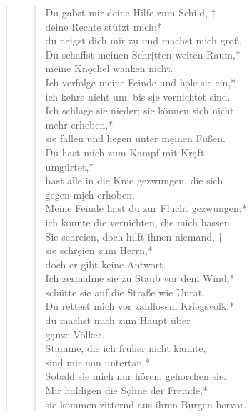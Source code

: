\begin{quote}
\begin{verse}

\vin Du gabst mir deine Hilfe zum Schild, †\\ \vin deine R\d echte stützt mich;*\\ \vin
du neigst dich mir z\d u und machst mich groß.\\

Du schaffst meinen Schr\d itten weiten Raum,*\\
meine Kn\d öchel wanken nicht.\\ \vin
Ich verfolge meine Feinde und h\d ole sie ein,*\\ \vin
ich kehre nicht um, bis s\d ie vernichtet sind.\\
Ich schlage sie nieder; sie können sich n\d icht\\  mehr erheben,*\\
sie fallen und liegen unter m\d einen Füßen.\\ \vin
Du hast mich zum Kampf mit Kr\d aft\\ \vin  umgürtet,*\\ \vin
hast alle in die Knie gezwungen, die sich \\ \vin gegen m\d ich erhoben.\\
Meine Feinde hast du zur Fl\d ucht gezwungen;*\\
ich konnte die vernichten, d\d ie mich hassen.\\ \vin
Sie schreien, doch hilft ihnen niemand, †\\ \vin  sie schr\d eien zum Herrn,*\\ \vin
doch er gibt k\d eine Antwort.\\
Ich zermalme sie zu St\d aub vor dem Wind,*\\
schütte sie auf die Str\d aße wie Unrat.\\ \vin
Du rettest mich vor z\d ahllosem Kriegsvolk,*\\ \vin
du machst mich zum Haupt über\\ \vin  g\d anze Völker.\\
Stämme, die ich früher nicht kannte,\\ sind m\d ir nun untertan.*\\
Sobald sie mich nur h\d ören, gehorchen sie.\\ \vin
Mir huldigen die S\d öhne der Fremde,*\\ \vin
sie kommen zitternd aus ihren B\d urgen hervor.\\
\end{verse}





\end{quote}